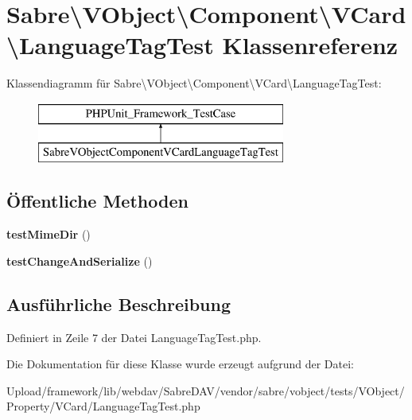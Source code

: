 \hypertarget{class_sabre_1_1_v_object_1_1_property_1_1_v_card_1_1_language_tag_test}{}\section{Sabre\textbackslash{}V\+Object\textbackslash{}Component\textbackslash{}V\+Card\textbackslash{}Language\+Tag\+Test Klassenreferenz}
\label{class_sabre_1_1_v_object_1_1_property_1_1_v_card_1_1_language_tag_test}
Klassendiagramm für Sabre\textbackslash{}V\+Object\textbackslash{}Component\textbackslash{}V\+Card\textbackslash{}Language\+Tag\+Test\+:\begin{figure}[H]
\begin{center}
\leavevmode
\includegraphics[height=2.000000cm]{class_sabre_1_1_v_object_1_1_property_1_1_v_card_1_1_language_tag_test}
\end{center}
\end{figure}
\subsection*{Öffentliche Methoden}
\begin{DoxyCompactItemize}
\item 
\mbox{\label{class_sabre_1_1_v_object_1_1_property_1_1_v_card_1_1_language_tag_test_a51a03fc19fd8d6bc4f7bd5489b592d9e}} 
{\bfseries test\+Mime\+Dir} ()
\item 
\mbox{\label{class_sabre_1_1_v_object_1_1_property_1_1_v_card_1_1_language_tag_test_a0809c0f774521074713878ff7470938d}} 
{\bfseries test\+Change\+And\+Serialize} ()
\end{DoxyCompactItemize}


\subsection{Ausführliche Beschreibung}


Definiert in Zeile 7 der Datei Language\+Tag\+Test.\+php.



Die Dokumentation für diese Klasse wurde erzeugt aufgrund der Datei\+:\begin{DoxyCompactItemize}
\item 
Upload/framework/lib/webdav/\+Sabre\+D\+A\+V/vendor/sabre/vobject/tests/\+V\+Object/\+Property/\+V\+Card/Language\+Tag\+Test.\+php\end{DoxyCompactItemize}
